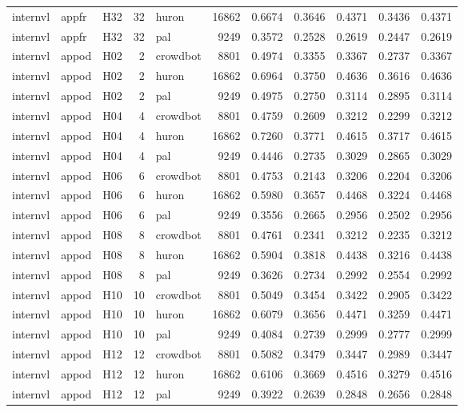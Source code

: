 \begin{table}[tbp]
\begin{tabular}{lllrlrrrrrr}
internvl & appfr & H32 & 32 & huron & 16862 & 0.6674 & 0.3646 & 0.4371 & 0.3436 & 0.4371 \\
internvl & appfr & H32 & 32 & pal & 9249 & 0.3572 & 0.2528 & 0.2619 & 0.2447 & 0.2619 \\
internvl & appod & H02 & 2 & crowdbot & 8801 & 0.4974 & 0.3355 & 0.3367 & 0.2737 & 0.3367 \\
internvl & appod & H02 & 2 & huron & 16862 & 0.6964 & 0.3750 & 0.4636 & 0.3616 & 0.4636 \\
internvl & appod & H02 & 2 & pal & 9249 & 0.4975 & 0.2750 & 0.3114 & 0.2895 & 0.3114 \\
internvl & appod & H04 & 4 & crowdbot & 8801 & 0.4759 & 0.2609 & 0.3212 & 0.2299 & 0.3212 \\
internvl & appod & H04 & 4 & huron & 16862 & 0.7260 & 0.3771 & 0.4615 & 0.3717 & 0.4615 \\
internvl & appod & H04 & 4 & pal & 9249 & 0.4446 & 0.2735 & 0.3029 & 0.2865 & 0.3029 \\
internvl & appod & H06 & 6 & crowdbot & 8801 & 0.4753 & 0.2143 & 0.3206 & 0.2204 & 0.3206 \\
internvl & appod & H06 & 6 & huron & 16862 & 0.5980 & 0.3657 & 0.4468 & 0.3224 & 0.4468 \\
internvl & appod & H06 & 6 & pal & 9249 & 0.3556 & 0.2665 & 0.2956 & 0.2502 & 0.2956 \\
internvl & appod & H08 & 8 & crowdbot & 8801 & 0.4761 & 0.2341 & 0.3212 & 0.2235 & 0.3212 \\
internvl & appod & H08 & 8 & huron & 16862 & 0.5904 & 0.3818 & 0.4438 & 0.3216 & 0.4438 \\
internvl & appod & H08 & 8 & pal & 9249 & 0.3626 & 0.2734 & 0.2992 & 0.2554 & 0.2992 \\
internvl & appod & H10 & 10 & crowdbot & 8801 & 0.5049 & 0.3454 & 0.3422 & 0.2905 & 0.3422 \\
internvl & appod & H10 & 10 & huron & 16862 & 0.6079 & 0.3656 & 0.4471 & 0.3259 & 0.4471 \\
internvl & appod & H10 & 10 & pal & 9249 & 0.4084 & 0.2739 & 0.2999 & 0.2777 & 0.2999 \\
internvl & appod & H12 & 12 & crowdbot & 8801 & 0.5082 & 0.3479 & 0.3447 & 0.2989 & 0.3447 \\
internvl & appod & H12 & 12 & huron & 16862 & 0.6106 & 0.3669 & 0.4516 & 0.3279 & 0.4516 \\
internvl & appod & H12 & 12 & pal & 9249 & 0.3922 & 0.2639 & 0.2848 & 0.2656 & 0.2848 \\

\end{tabular}
\end{table}
